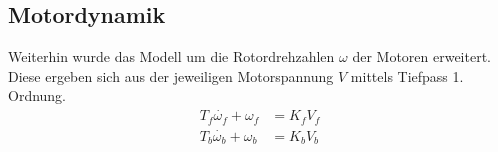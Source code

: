 \documentclass[times, 10pt,twocolumn]{article}
\begin{document}

	\subsection{Motordynamik}

	Weiterhin wurde das Modell um die Rotordrehzahlen $\omega$ der Motoren erweitert. Diese ergeben sich aus der jeweiligen Motorspannung $V$ mittels Tiefpass 1. Ordnung.
	\begin{align}
	T_f \dot{\omega_f} + \omega_f &= K_f V_f\\
	T_b \dot{\omega_b} + \omega_b &= K_b V_b
	\end{align}
\end{document}
